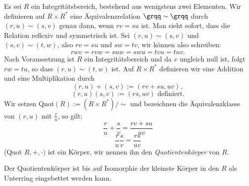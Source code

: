
\begin{satz}\label{quotkoerper} %
Es sei $R$ ein Integritätsbereich, bestehend aus wenigstens zwei Elementen. Wir definieren auf $R\times R^*$ eine Äquivalenzrelation $\grqq\sim\grqq$ durch $\left(r,u\right) \sim \left(s, v\right)$ genau dann, wenn $rv = su$ ist. Man sieht sofort, dass die Relation reflexiv und symmetrisch ist. Sei $\left(r,u\right) \sim \left(s, v\right)$ und $ \left(s, v\right) \sim \left(t, w\right) $, also $rv = su$ und $sw = tv$, wir können also schreiben: \\
\[rwv = rvw = suw = swu = tvu = tuv.\]
Nach Voraussetzung ist $R$ ein Integritätsbereich und da $v$ ungleich null ist, folgt $rw = tu$, so dass $\left(r,u \right) \sim \left(t, w\right)$ ist. Auf $R\times R^*$ definieren wir eine Addition und eine Multiplikation durch 
\[\left(r,u\right)+ \left(s,v\right) := \left(rv + su, uv\right),\]
\[\left(r,u\right)\left(s,v\right) := \left(rs, uv\right)\text{ definiert.}\] %
Wir setzen Quot$(R) := (R\times R^*)/\sim$ und bezeichnen die Äquivalenzklasse von $(r,u) $ mit $\frac{r}{u}$, so gilt: 
\[\frac{r}{u} + \frac{s}{v} = \frac{rv + su}{uv}\]
\[\frac{r}{u}\frac{s}{v} = \frac{rs}{uv}\]
(Quot $R, +, \cdot)$ ist ein Körper, wir nennen ihn den \textit{Quotientenkörper} von $R$.
\end{satz}
Der Quotientenkörper ist bis auf Isomorphie der kleinste Körper in den $R$ als Unterring eingebettet werden kann.

